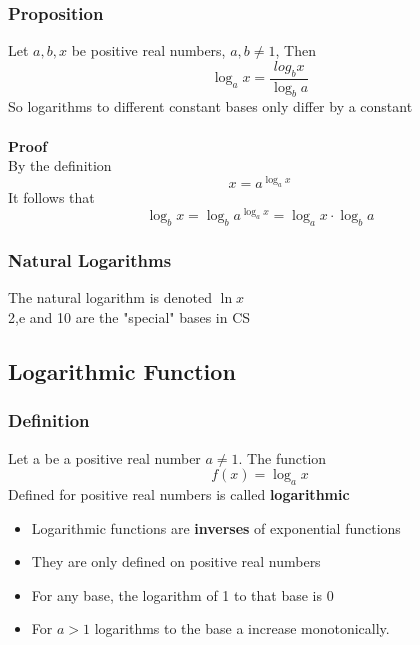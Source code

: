 \documentclass{article}[18pt]
\begin{document}
\subsubsection{Proposition}
Let $a,b,x$ be positive real numbers, $a,b \neq 1$, Then
$$\log_ax=\dfrac{log_bx}{\log_ba}$$
So logarithms to different constant bases only differ by a constant\\
\\
\textbf{Proof}\\
By the definition
{\large $$x=a^{\log_ax}$$ }
It follows that
{\large $$\log_bx=\log_ba^{\log_ax}=\log_ax\cdot\log_ba$$}
\subsubsection{Natural Logarithms}
The natural logarithm is denoted $\ln x$\\
2,e and 10 are the "special" bases in CS
\subsection{Logarithmic Function}
\subsubsection{Definition}
Let a be a positive real number $a\neq 1$. The function
$$f(x)=\log_ax$$
Defined for positive real numbers is called \textbf{logarithmic}
\begin{itemize}
	\item Logarithmic functions are \textbf{inverses} of exponential functions
	\item They are only defined on positive real numbers
	\item For any base, the logarithm of 1 to that base is 0
	\item For $a>1$ logarithms to the base a increase monotonically.
\end{itemize}
\end{document}
